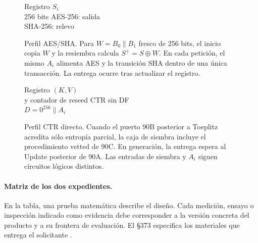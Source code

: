 {{}}

\begin{figure}[htbp]
\centering
{}
 {Registro $S_i$\\256 bits}
 {AES-256: salida\\SHA-256: relevo}
\caption{Perfil AES/SHA. Para $W=B_0\|B_1$ fresco de 256 bits, el inicio copia $W$ y la resiembra calcula $S^+=S\oplus W$.
En cada petición, el mismo $A_i$ alimenta AES y la transición SHA dentro
de una única transacción. La entrega ocurre tras actualizar el registro.}
\label{fig:dos-aes-sha}
\end{figure}

\begin{figure}[htbp]
\centering
{}
 {Registro $(K,V)$\\y contador de reseed}
 {CTR sin DF\\$D=0^{256}\|A_i$}
\caption{Perfil CTR directo. Cuando el puerto 90B posterior a Toeplitz
acredita sólo entropía parcial, la caja de siembra incluye el procedimiento
vetted de 90C. En generación, la entrega espera al Update posterior de
90A. Las entradas de siembra y $A_i$ siguen circuitos lógicos distintos.}
\label{fig:dos-ctr}
\end{figure}

\paragraph{Matriz de los dos expedientes.}
En la tabla, una prueba matemática describe el diseño. Cada medición,
ensayo o inspección indicado como evidencia debe corresponder a la versión
concreta del producto y a su frontera de evaluación. El §373 especifica
los materiales que entrega el solicitante
\cite[§§373--375, 380--388, 397--403 y 422--423]{ais}.


